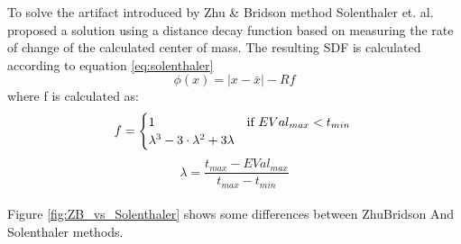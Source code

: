 To solve the artifact introduced by Zhu \& Bridson method Solenthaler et. al. \cite{Solenthaler} proposed a solution using a distance decay function based on measuring the rate of change of the calculated center of  mass. The resulting SDF is calculated according to equation \ref{eq:solenthaler}
\begin{equation}
	\phi(x) = |x - \bar{x}| - Rf
	\label{eq:solenthaler}
\end{equation}
where f is calculated as:
\begin{equation}
	f = 
	\begin{cases}
		1 & \text{if $EVal_{max} < t_{min}$}\\
		\lambda^3 -3\cdot\lambda^2 + 3\lambda
	\end{cases}\\
\end{equation}
\begin{equation}
	\lambda = \dfrac{t_{max} - EVal_{max}}{t_{max} - t_{min}}
\end{equation}\\
Figure \ref{fig:ZB_vs_Solenthaler} shows some differences between ZhuBridson And Solenthaler methods.
